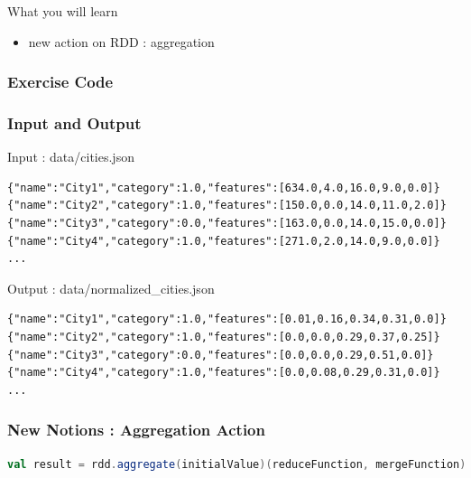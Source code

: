 \documentclass[slidetop,9pt,utf8]{beamer}
\begin{document}
\begin{CJK}{UTF8}{gbsn}
\begin{frame}
  \begin{block}{What you will learn}
    \begin{itemize}
      \item new action on RDD : aggregation
    \end{itemize}
  \end{block}

\end{frame}

\begin{frame}
  \frametitle{Exercise Code}

  

\end{frame}

\begin{frame}[fragile]

  \frametitle{Input and Output}
  
  \begin{block}{Input : data/cities.json}
    \begin{verbatim}
{"name":"City1","category":1.0,"features":[634.0,4.0,16.0,9.0,0.0]}
{"name":"City2","category":1.0,"features":[150.0,0.0,14.0,11.0,2.0]}
{"name":"City3","category":0.0,"features":[163.0,0.0,14.0,15.0,0.0]}
{"name":"City4","category":1.0,"features":[271.0,2.0,14.0,9.0,0.0]}
...
    \end{verbatim}
  \end{block}

  \begin{block}{Output : data/normalized\_cities.json}
    \begin{verbatim}
{"name":"City1","category":1.0,"features":[0.01,0.16,0.34,0.31,0.0]}
{"name":"City2","category":1.0,"features":[0.0,0.0,0.29,0.37,0.25]}
{"name":"City3","category":0.0,"features":[0.0,0.0,0.29,0.51,0.0]}
{"name":"City4","category":1.0,"features":[0.0,0.08,0.29,0.31,0.0]}
...
    \end{verbatim}
  \end{block}

\end{frame}

\begin{frame}[fragile]
  \frametitle{New Notions : Aggregation Action}


  \begin{lstlisting}[label=Aggregate, caption=Aggregation over an RDD, language=scala, style=code]
val result = rdd.aggregate(initialValue)(reduceFunction, mergeFunction)
  \end{lstlisting}



\end{frame}
\end{CJK}
\end{document}
